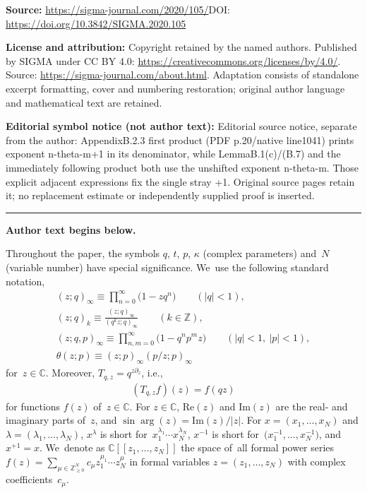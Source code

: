 \documentclass[11pt]{article}
\numberwithin{equation}{section}
\renewcommand{\Re}{\mathrm{Re}}
\renewcommand{\Im}{\mathrm{Im}}
\newcommand{\C}{{\mathbb C}}
\newcommand{\Z}{{\mathbb Z}}
\begin{document}
\noindent\textbf{Source:} \url{https://sigma-journal.com/2020/105/}\quad DOI: \url{https://doi.org/10.3842/SIGMA.2020.105}\par
\noindent\textbf{License and attribution:} Copyright retained by the named authors. Published by SIGMA under CC BY 4.0: \url{https://creativecommons.org/licenses/by/4.0/}. Source: \url{https://sigma-journal.com/about.html}. Adaptation consists of standalone excerpt formatting, cover and numbering restoration; original author language and mathematical text are retained.\par
\noindent\textbf{Editorial symbol notice (not author text):} Editorial source notice, separate from the author: AppendixB.2.3 first product (PDF p.20/native line1041) prints exponent n-theta-m+1 in its denominator, while LemmaB.1(c)/(B.7) and the immediately following product both use the unshifted exponent n-theta-m. Those explicit adjacent expressions fix the single stray +1. Original source pages retain it; no replacement estimate or independently supplied proof is inserted.\par
\medskip\hrule\medskip\noindent\textbf{Author text begins below.}\par
\setcounter{section}{1}
\setcounter{subsection}{0}
\setcounter{subsubsection}{0}
\setcounter{Theorem}{0}
\setcounter{equation}{0}
 Throughout the paper, the symbols $q$, $t$, $p$, $\kappa$ (complex parameters) and~$N$ (variable number) have special significance. We~use the following standard notation,
\begin{gather*}
(z;q)_\infty \equiv \prod_{n=0}^\infty\big(1-zq^n\big)\qquad (|q|<1),
\\
(z;q)_k\equiv \frac{(z;q)_\infty}{(q^k z;q)_\infty} \qquad (k\in\Z),
\\
(z;q,p)_\infty\equiv \prod_{n,m=0}^\infty \big(1-q^np^m z\big)\qquad (|q|<1,\ |p|<1),
\\
\theta(z;p) \equiv (z;p)_\infty(p/z;p)_\infty
\end{gather*}
for~$z\in\C$. Moreover, $T_{q,z}=q^{z\partial_z}$, i.e.,
\begin{gather*}
(T_{q,z}f)(z)=f(qz)
\end{gather*}
for functions $f(z)$ of~$z\in\C$.
For $z\in\C$, $\Re(z)$ and $\Im(z)$ are the real- and imaginary parts of~$z$, and $\sin\arg(z) = \Im(z)/|z|$. For $x=(x_1,\dots,x_N)$ and $\lambda=(\lambda_1,\dots,\lambda_N)$, $x^\lambda$ is short for~$x_1^{\lambda_1}\cdots x_N^{\lambda_N}$, $x^{-1}$ is short for~$\big(x_1^{-1},\dots,x_N^{-1}\big)$, and $x^{+1}=x$.
We~denote as $\C[[z_1,\dots,z_N]]$ the space of~all formal power series $f(z)=\sum_{\mu\in\Z_{\geq 0}^N}c_\mu z_1^{\mu_1}\cdots z_N^{\mu}$ in formal variables $z=(z_1,\dots, z_N)$ with complex coefficients~$c_\mu$.
\end{document}
